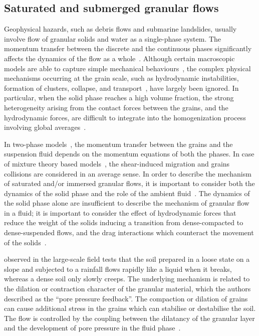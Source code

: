 \subsection{Saturated and submerged granular flows}
Geophysical hazards, such as debris flows and submarine landslides, usually 
involve flow of granular solids and water as a single-phase system. The 
momentum transfer between the discrete and the continuous phases significantly 
affects the dynamics of the flow as a whole~\citep{Topin2011}. Although certain 
macroscopic models are able to capture simple mechanical 
behaviours~\citep{Peker2007}, the complex physical mechanisms occurring at the 
grain scale, such as hydrodynamic instabilities, formation of clusters, 
collapse, and transport~\citep{Topin2011}, have largely been ignored. In 
particular, when the solid phase reaches a high volume fraction, the strong 
heterogeneity arising from the contact forces between the grains, and the 
hydrodynamic forces, are difficult to integrate into the homogenization process 
involving global averages~\citep{Topin2011}. 

In two-phase models~\citep{Pitman2005}, the momentum transfer between the 
grains and the suspension fluid depends on the momentum equations of both 
the phases. In case of mixture theory based models~\citep{Meruane2010}, the 
shear-induced migration 
and grains collisions are considered in an average sense. In order to 
describe the mechanism of saturated and/or immersed granular flows, it is 
important to consider both the dynamics of the solid phase and the role of the 
ambient fluid~\citep{Denlinger2001,Iverson1997}. The dynamics of the solid 
phase alone are insufficient to describe the mechanism of granular flow in a 
fluid; it is important to consider the effect of hydrodynamic forces that 
reduce the weight of the solids inducing a transition from dense-compacted to 
dense-suspended flows, and the drag interactions which counteract the movement 
of the solids~\citep{Meruane2010}.


\citet{Iverson2000} observed in the 
large-scale field tests that the soil prepared in a loose state on a slope and 
subjected to a rainfall flows rapidly like a liquid when it breaks, whereas a 
dense soil only slowly creeps. The underlying mechanism is related
to the dilation or contraction character of the granular material, which the 
authors described as the ``pore pressure feedback''. The compaction or dilation 
of grains can cause additional stress in the grains which can stabilise or 
destabilise the soil. The flow is controlled by the coupling between the 
dilatancy of the granular layer and the development of pore pressure in the 
fluid phase~\citep{Pailha2008}.

